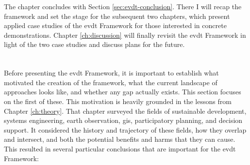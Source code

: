 The chapter concludes with Section \ref{sec:evdt-conclusion}. There I will recap the framework and set the stage for the subsequent two chapters, which present applied case studies of the \ac{evdt} Framework for those interested in concrete demonstrations. Chapter \ref{ch:discussion} will finally revisit the \ac{evdt} Framework in light of the two case studies and discuss plans for the future. 

\section{} \label{sec:need}

Before presenting the \ac{evdt} Framework, it is important to establish what motivated the creation of the framework, what the current landscape of approaches looks like, and whether any gap actually exists. This section focuses on the first of these. This motivation is heavily grounded in the lessons from Chapter \ref{ch:theory}. That chapter surveyed the fields of sustainable development, systems engineering, earth observation, \ac{gis}, participatory planning, and decision support. It considered the history and trajectory of these fields, how they overlap and intersect, and both the potential benefits and harms that they can cause. This resulted in several particular conclusions that are important for the \ac{evdt} Framework:

